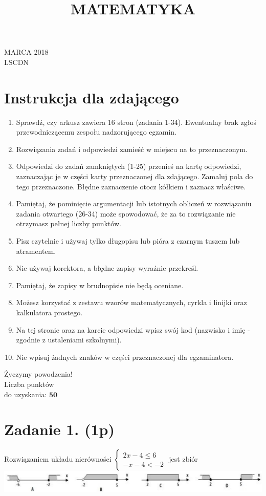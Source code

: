 \documentclass[10pt]{article}
\title{MATEMATYKA }
\author{}
\date{}
\begin{document}
 MARCA 2018\\
LSCDN

\section*{Instrukcja dla zdającego}
\begin{enumerate}
  \item Sprawdź, czy arkusz zawiera 16 stron (zadania 1-34). Ewentualny brak zgłoś przewodniczącemu zespołu nadzorującego egzamin.
  \item Rozwiązania zadań i odpowiedzi zamieść w miejscu na to przeznaczonym.
  \item Odpowiedzi do zadań zamkniętych (1-25) przenieś na kartę odpowiedzi, zaznaczając je w części karty przeznaczonej dla zdającego. Zamaluj pola do tego przeznaczone. Błędne zaznaczenie otocz kółkiem i zaznacz właściwe.
  \item Pamiętaj, że pominięcie argumentacji lub istotnych obliczeń w rozwiązaniu zadania otwartego (26-34) może spowodować, że za to rozwiązanie nie otrzymasz pełnej liczby punktów.
  \item Pisz czytelnie i używaj tylko długopisu lub pióra z czarnym tuszem lub atramentem.
  \item Nie używaj korektora, a błędne zapisy wyraźnie przekreśl.
  \item Pamiętaj, że zapisy w brudnopisie nie będą oceniane.
  \item Możesz korzystać z zestawu wzorów matematycznych, cyrkla i linijki oraz kalkulatora prostego.
  \item Na tej stronie oraz na karcie odpowiedzi wpisz swój kod (nazwisko i imię - zgodnie z ustaleniami szkolnymi).
  \item Nie wpisuj żadnych znaków w części przeznaczonej dla egzaminatora.
\end{enumerate}

Życzymy powodzenia!\\
Liczba punktów\\
do uzyskania: \(\mathbf{5 0}\)

\section*{Zadanie 1. (1p)}
Rozwiązaniem układu nierówności \(\left\{\begin{array}{c}2 x-4 \leq 6 \\ -x-4<-2\end{array}\right.\) jest zbiór\\
\includegraphics[max width=\textwidth, center]{2024_11_21_19ede52d758866b0d67eg-02}
\end{document}
